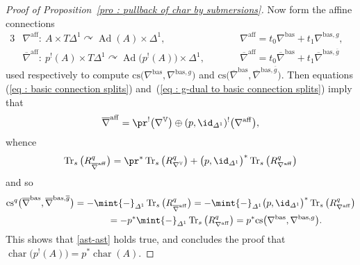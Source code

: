 \begin{proof}[Proof of Proposition~\ref{pro : pullback of char by submersions}]
Now form the affine connections
\begin{alignat*}{3}
& \nabla^{\mathrm{aff}} \colon \ A \times T\varDelta^1 \curvearrowright \operatorname{Ad}(A) \times \varDelta^1, \qquad && \nabla^{\mathrm{aff}}=t_0\nabla^{\mathrm{bas}}+t_1\nabla^{\mathrm{bas},g},&\\
& \overline{\nabla}^{\mathrm{aff}} \colon \ p^!(A) \times T\varDelta^1 \curvearrowright \operatorname{Ad}\big(p^!(A)\big) \times \varDelta^1, \qquad && \overline{\nabla}^{\mathrm{aff}} = t_0\overline{\nabla}^{\mathrm{bas}}+t_1 \overline{\nabla}^{\mathrm{bas},\overline{g}}&
\end{alignat*}used respectively to compute $\mathrm{cs}\big(\nabla^{\mathrm{bas}}\!{,}\nabla^{\mathrm{bas},g}\big)$ and $\mathrm{cs}\big(\overline{\nabla}^{\mathrm{bas}}\!{,}\overline{\nabla}^{\mathrm{bas},\overline{g}}\big)$. Then equations (\ref{eq : basic connection splits}) and~(\ref{eq : g-dual to basic connection splits}) imply that
\begin{gather*}%
 \overline{\nabla}^{\mathrm{aff}} = \pr^!\big(\nabla^{\mathbb{V}}\big) \oplus (p,\id_{\varDelta^1})^!\big(\nabla^{\mathrm{aff}}\big),
\end{gather*}whence
\begin{gather*}
 \operatorname{Tr}_s\big(R_{\overline{\nabla}^{\mathrm{aff}}}^q\big) =\pr^*\operatorname{Tr}_s\big(R_{\nabla^{\mathbb{V}}}^q\big) + \big(p,\id_{\varDelta^1}\big)^*\operatorname{Tr}_s\big(R_{\nabla^{\mathrm{aff}}}^q\big)
\end{gather*}and so
 \begin{gather*}
 \mathrm{cs}^q\big(\overline{\nabla}^{\mathrm{bas}},\overline{\nabla}^{\mathrm{bas},\overline{g}}\big) = -\mint{-}_{\varDelta^1}\operatorname{Tr}_s\big(R_{\overline{\nabla}^{\mathrm{aff}}}^q\big) = -\mint{-}_{\varDelta^1}\big(p,\id_{\varDelta^1}\big)^*\operatorname{Tr}_s\big(R_{\nabla^{\mathrm{aff}}}^q\big) \\
 \hphantom{\mathrm{cs}^q\big(\overline{\nabla}^{\mathrm{bas}},\overline{\nabla}^{\mathrm{bas},\overline{g}}\big)}{}
 = -p^*\mint{-}_{\varDelta^1}\operatorname{Tr}_s\big(R_{\nabla^{\mathrm{aff}}}^q\big) = p^*\mathrm{cs}\big(\nabla^{\mathrm{bas}},\nabla^{\mathrm{bas},g}\big).
 \end{gather*}This shows that \eqref{ast-ast} holds true, and concludes the proof that $\operatorname{char}\big(p^!(A)\big) = p^*\operatorname{char}(A)$.
 \end{proof}
